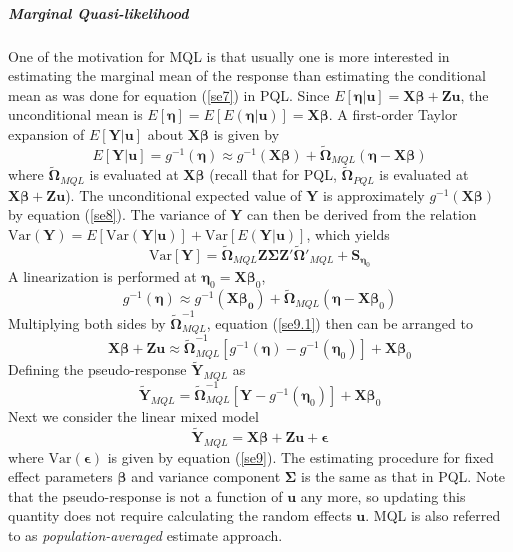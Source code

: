 \subparagraph*{Marginal Quasi-likelihood} 
One of the motivation for MQL is that usually one is more interested in estimating the marginal
mean of the response than estimating the conditional mean as was done for equation (\ref{se7}) in
PQL. Since $E[\bm \eta|\bm u]= \bm {X\beta} + \bm {Zu}$, the unconditional mean is $E[\bm \eta] =
E[E(\bm \eta|\bm u)]= \bm {X\beta}$. A first-order Taylor expansion of $E[\bm Y|\bm u]$ about $\bm X
\bm\beta$ is given by 
\begin{equation}\label{se8}
	E[\bm Y|\bm u] = g^{-1}(\bm \eta) \approx g^{-1} (\bm{X\beta}) + \tilde{\bm \Omega}_{MQL} (\bm
	\eta - \bm X\bm \beta)
\end{equation}
where $\tilde{\bm \Omega}_{MQL}$ is evaluated at $\bm {X\beta}$ (recall that for PQL, $\tilde{\bm
	\Omega}_{PQL}$ is evaluated at $\bm {X\beta} + \bm {Zu}$). The unconditional expected value of 
$\bm
Y$ is approximately $g^{-1}(\bm {X\beta})$ by equation (\ref{se8}). The variance of $\bm Y$ can then
be derived from the relation $\text{Var}(\bm Y)= E[\text{Var}(\bm Y|\bm u)] + \text{Var}[E(\bm Y|
\bm u)]$, which yields
\begin{equation}\label{se9}
	\text{Var}[\bm Y] = \tilde{\bm \Omega}_{MQL} \bm {Z\Sigma Z'}\tilde{\bm \Omega}'_{MQL} + \bm
	S_{\bm \eta_0}
\end{equation}
A linearization is performed at $\bm \eta_0= \bm X \bm \beta_0$, 
\begin{equation}\label{se9.1}
	g^{-1}(\bm \eta) \approx g^{-1} (\bm{X\beta_0}) + \tilde{\bm \Omega}_{MQL} (\bm \eta - \bm X\bm
	\beta_0)
\end{equation}
Multiplying both sides by $\tilde{\bm \Omega}_{MQL} ^{-1}$, equation (\ref{se9.1}) then can be
arranged to 
\[\bm {X\beta} + \bm {Zu} \approx \tilde{\bm \Omega}_{MQL}^{-1}[g^{-1}(\bm\eta)- g^{-1}(\bm
\eta_0)]  + \bm{X}\bm \beta_0 \]
Defining the pseudo-response $\tilde{\bm Y}_{MQL}$ as
\begin{equation}\label{se10}
	\tilde{\bm Y}_{MQL} =  \tilde{\bm \Omega}_{MQL}^{-1}[\bm Y- g^{-1}(\bm \eta_0)]  + \bm{X}\bm
	\beta_0 
\end{equation}
Next we consider the linear mixed model 
\[ \tilde{\bm Y}_{MQL}  = \bm {X\beta}+ \bm {Zu}  + \bm \epsilon\] 
where $\text{Var}(\bm \epsilon) $ is given by equation (\ref{se9}).  The estimating procedure for
fixed effect parameters $\bm \beta$ and variance component $\bm \Sigma$ is the same as that in PQL.
Note that the pseudo-response is not a function of $\bm u$ any more, so updating this quantity does
not require calculating the random effects $\bm u$. MQL is also referred to as
\textit{population-averaged} estimate approach.

